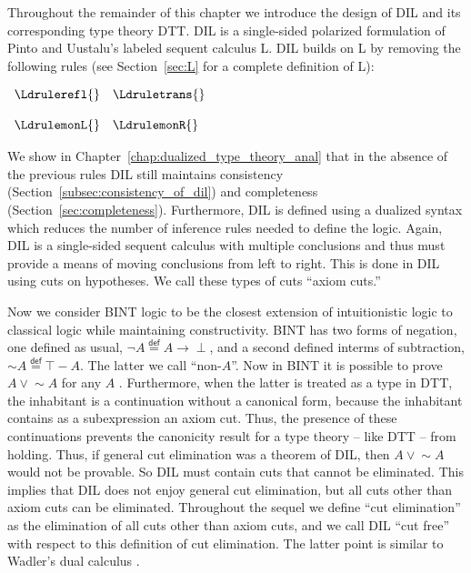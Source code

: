Throughout the remainder of this chapter we introduce the design of
DIL and its corresponding type theory DTT.  DIL is a single-sided
polarized formulation of Pinto and Uustalu's labeled sequent calculus
L.  DIL builds on L by removing the following rules (see
Section~\ref{sec:L} for a complete definition of L):
\begin{center}
  \begin{math}
    \begin{array}{lll}
      \Ldrulerefl{} & \Ldruletrans{}\\
      & \\
      \LdrulemonL{} & \LdrulemonR{}   
    \end{array}
  \end{math}
\end{center} 
We show in Chapter~\ref{chap:dualized_type_theory_anal} that in the
absence of the previous rules DIL still maintains
consistency
(Section~\ref{subsec:consistency_of_dil}) and completeness
(Section~\ref{sec:completeness}).  Furthermore, DIL is defined using a
dualized syntax which reduces the number of inference rules needed to
define the logic.  Again, DIL is a single-sided sequent calculus with
multiple conclusions and thus must provide a means of moving
conclusions from left to right. This is done in DIL using cuts on
hypotheses. We call these types of cuts ``axiom cuts.''

Now we consider BINT logic to be the closest extension of
intuitionistic logic to classical logic while maintaining
constructivity.  BINT has two forms of negation, one defined as usual,
$\lnot A \stackrel{\mathsf{def}}{=} A \to \perp$, and a second defined
interms of subtraction, $\mathop{\sim} A \stackrel{\mathsf{def}}{=}
\top - A$.  The latter we call ``non-$A$''.  Now in BINT it is
possible to prove $A \lor \mathop{\sim} A$ for any $A$
\cite{crolard01}. Furthermore, when the latter is treated as a type in
DTT, the inhabitant is a continuation without a canonical form,
because the inhabitant contains as a subexpression an axiom cut.
Thus, the presence of these continuations prevents the canonicity
result for a type theory -- like DTT -- from holding.  Thus, if
general cut elimination was a theorem of DIL, then $A \lor
\mathop{\sim} A$ would not be provable.  So DIL must contain cuts
that cannot be eliminated.  This implies that DIL does not enjoy
general cut elimination, but all cuts other than axiom cuts can be
eliminated. Throughout the sequel we define ``cut elimination'' as the
elimination of all cuts other than axiom cuts, and we call DIL ``cut
free'' with respect to this definition of cut elimination. The latter
point is similar to Wadler's dual calculus \cite{Wadler:2005}.

